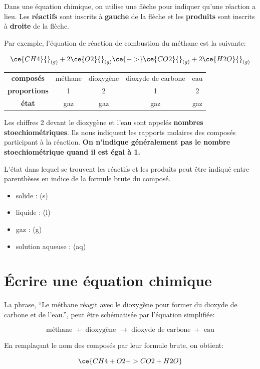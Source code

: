 \documentclass[
  11pt,
  french,
  a4paper,
  openany]{book}
\providecommand{\tightlist}{%
  \setlength{\itemsep}{0pt}\setlength{\parskip}{0pt}}
\begin{document}
Dans une équation chimique, on utilise une flèche pour indiquer qu'une réaction a lieu. Les \textbf{réactifs} sont inscrits à \textbf{gauche} de la flèche et les \textbf{produits} sont inscrits à \textbf{droite} de la flèche.

Par exemple, l'équation de réaction de combustion du méthane est la suivante:

\[ \ce{CH4} {}_{(g)} + 2 \ce{O2} {}_{(g)} \ce{->} \ce{CO2} {}_{(g)} + 2 \ce{H2O} {}_{(g)} \]

\begin{longtable}[]{@{}ccccc@{}}
\toprule
\endhead
\textbf{composés} & méthane & dioxygène & dioxyde de carbone & eau\tabularnewline
\textbf{proportions} & 1 & 2 & 1 & 2\tabularnewline
\textbf{état} & gaz & gaz & gaz & gaz\tabularnewline
\bottomrule
\end{longtable}

Les chiffres 2 devant le dioxygène et l'eau sont appelés \textbf{nombres stoechiométriques}. Ils nous indiquent les rapports molaires des composés participant à la réaction. \textbf{On n'indique généralement pas le nombre stoechiométrique quand il est égal à 1.}

L'état dans lequel se trouvent les réactifs et les produits peut être indiqué entre parenthèses en indice de la formule brute du composé.

\begin{itemize}
\tightlist
\item
  solide : (s)
\item
  liquide : (l)
\item
  gaz : (g)
\item
  solution aqueuse : (aq)
\end{itemize}

\hypertarget{uxe9crire-une-uxe9quation-chimique}{%
\section{Écrire une équation chimique}\label{uxe9crire-une-uxe9quation-chimique}}

La phrase, ``Le méthane réagit avec le dioxygène pour former du dioxyde de carbone et de l'eau.'', peut être schématisée par l'équation simplifiée:

\[ \text{méthane } + \text{ dioxygène } \longrightarrow \text{ dioxyde de carbone } + \text{ eau} \]

En remplaçant le nom des composés par leur formule brute, on obtient:

\[ \ce{CH4 + O2 -> CO2 + H2O} \]
\end{document}
